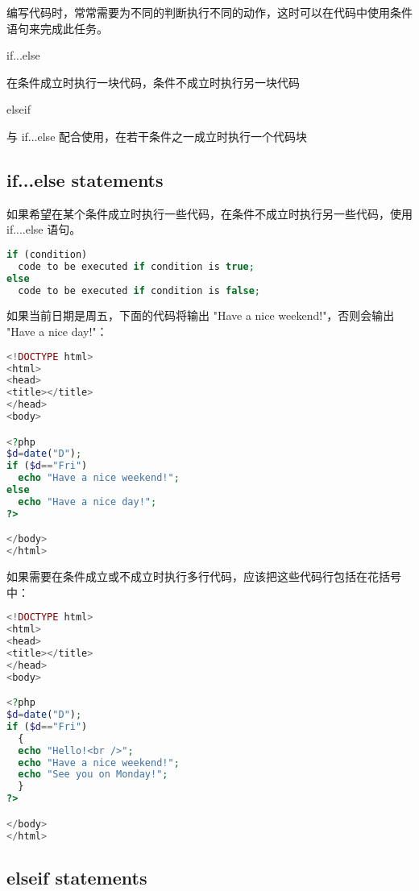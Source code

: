 编写代码时，常常需要为不同的判断执行不同的动作，这时可以在代码中使用条件语句来完成此任务。

\begin{compactitem}
\item if...else

在条件成立时执行一块代码，条件不成立时执行另一块代码

\item elseif

与 if...else 配合使用，在若干条件之一成立时执行一个代码块
\end{compactitem}



\subsection{if...else statements}

如果希望在某个条件成立时执行一些代码，在条件不成立时执行另一些代码，使用 if....else 语句。

\begin{lstlisting}[language=PHP]
if (condition)
  code to be executed if condition is true;
else
  code to be executed if condition is false; 
\end{lstlisting}


如果当前日期是周五，下面的代码将输出 "Have a nice weekend!"，否则会输出 "Have a nice day!"：


\begin{lstlisting}[language=PHP]
<!DOCTYPE html>
<html>
<head>
<title></title>
</head>
<body>

<?php
$d=date("D");
if ($d=="Fri")
  echo "Have a nice weekend!"; 
else
  echo "Have a nice day!"; 
?>

</body>
</html>
\end{lstlisting}

如果需要在条件成立或不成立时执行多行代码，应该把这些代码行包括在花括号中：

\begin{lstlisting}[language=PHP]
<!DOCTYPE html>
<html>
<head>
<title></title>
</head>
<body>

<?php
$d=date("D");
if ($d=="Fri")
  {
  echo "Hello!<br />"; 
  echo "Have a nice weekend!";
  echo "See you on Monday!";
  }
?>

</body>
</html>
\end{lstlisting}


\subsection{elseif statements}


